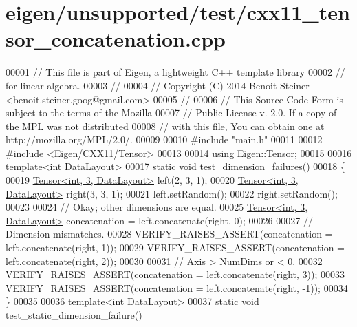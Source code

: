 \hypertarget{eigen_2unsupported_2test_2cxx11__tensor__concatenation_8cpp_source}{}\section{eigen/unsupported/test/cxx11\+\_\+tensor\+\_\+concatenation.cpp}
\label{eigen_2unsupported_2test_2cxx11__tensor__concatenation_8cpp_source}

\begin{DoxyCode}
00001 \textcolor{comment}{// This file is part of Eigen, a lightweight C++ template library}
00002 \textcolor{comment}{// for linear algebra.}
00003 \textcolor{comment}{//}
00004 \textcolor{comment}{// Copyright (C) 2014 Benoit Steiner <benoit.steiner.goog@gmail.com>}
00005 \textcolor{comment}{//}
00006 \textcolor{comment}{// This Source Code Form is subject to the terms of the Mozilla}
00007 \textcolor{comment}{// Public License v. 2.0. If a copy of the MPL was not distributed}
00008 \textcolor{comment}{// with this file, You can obtain one at http://mozilla.org/MPL/2.0/.}
00009 
00010 \textcolor{preprocessor}{#include "main.h"}
00011 
00012 \textcolor{preprocessor}{#include <Eigen/CXX11/Tensor>}
00013 
00014 \textcolor{keyword}{using} \hyperlink{class_eigen_1_1_tensor}{Eigen::Tensor};
00015 
00016 \textcolor{keyword}{template}<\textcolor{keywordtype}{int} DataLayout>
00017 \textcolor{keyword}{static} \textcolor{keywordtype}{void} test\_dimension\_failures()
00018 \{
00019   \hyperlink{class_eigen_1_1_tensor}{Tensor<int, 3, DataLayout>} left(2, 3, 1);
00020   \hyperlink{class_eigen_1_1_tensor}{Tensor<int, 3, DataLayout>} right(3, 3, 1);
00021   left.setRandom();
00022   right.setRandom();
00023 
00024   \textcolor{comment}{// Okay; other dimensions are equal.}
00025   \hyperlink{class_eigen_1_1_tensor}{Tensor<int, 3, DataLayout>} concatenation = left.concatenate(right, 0);
00026 
00027   \textcolor{comment}{// Dimension mismatches.}
00028   VERIFY\_RAISES\_ASSERT(concatenation = left.concatenate(right, 1));
00029   VERIFY\_RAISES\_ASSERT(concatenation = left.concatenate(right, 2));
00030 
00031   \textcolor{comment}{// Axis > NumDims or < 0.}
00032   VERIFY\_RAISES\_ASSERT(concatenation = left.concatenate(right, 3));
00033   VERIFY\_RAISES\_ASSERT(concatenation = left.concatenate(right, -1));
00034 \}
00035 
00036 \textcolor{keyword}{template}<\textcolor{keywordtype}{int} DataLayout>
00037 \textcolor{keyword}{static} \textcolor{keywordtype}{void} test\_static\_dimension\_failure()

\end{DoxyCode}
